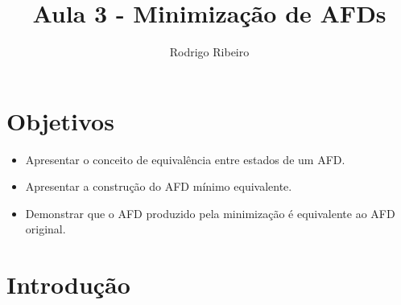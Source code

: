 \documentclass[a4paper]{article}
\theoremstyle{definition}
\begin{document}
  \title{Aula 3 - Minimização de AFDs}
  \author{Rodrigo Ribeiro}

  \maketitle


  \pagestyle{fancy}


  \section*{Objetivos}

  \begin{itemize}
     \item Apresentar o conceito de equivalência entre estados de um AFD.
     \item Apresentar a construção do AFD mínimo equivalente. 
     \item Demonstrar que o AFD produzido pela minimização é equivalente ao
           AFD original.
  \end{itemize}

  \section{Introdução}
\end{document}
